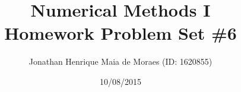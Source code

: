 \title{Numerical Methods I \\ Homework Problem Set \#6}
\author{Jonathan Henrique Maia de Moraes (ID: 1620855)}
\date{10/08/2015}
\maketitle